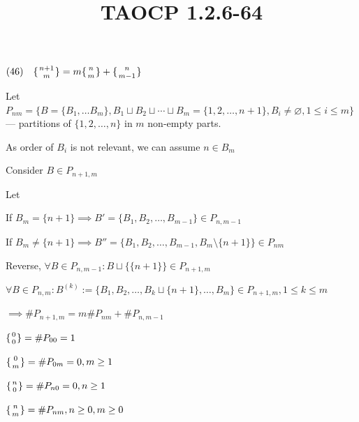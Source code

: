\documentclass{article}
\title{TAOCP 1.2.6\mbox{-}64}
\begin{document}
\maketitle

\( (46)\quad \{{{n+1} \atop m}\} = m\{{{n} \atop m}\} + \{{{n} \atop m - 1}\} \)

Let \( P_{nm} = \{ B = \{ B_{1}, \ldots B_{m} \}, B_{1}\sqcup B_{2}\sqcup \cdots \sqcup B_{m} = \{ 1, 2, \ldots, n + 1 \}, B_{i} \neq \varnothing, 1 \leq i \leq m \} \) --- partitions of \( \{ 1, 2, \ldots, n\} \) in \( m \) non-empty parts.

As order of \( B_{i} \) is not relevant, we can assume \( n \in B_{m} \)

Consider \( B \in P_{n+1,m} \)

Let

If \( B_{m} = \{ n + 1 \} \implies B' = \{ B_{1}, B_{2}, \ldots, B_{m-1} \} \in P_{n,m-1} \)

If \( B_{m} \neq \{ n + 1 \} \implies B'' = \{ B_{1}, B_{2}, \ldots, B_{m-1}, B_{m} \setminus \{ n + 1 \} \} \in P_{nm} \)

Reverse, \( \forall B \in P_{n, m-1}: B \sqcup \{ \{ n + 1 \} \} \in P_{n+1,m} \)

\( \forall B \in P_{n, m}: B^{(k)} := \{ B_{1}, B_{2}, \ldots, B_{k} \sqcup \{ n + 1 \}, \ldots, B_{m} \} \in P_{n+1,m}, 1 \leq k \leq m \)

\( \implies \#P_{n+1,m} = m \#P_{nm} + \#P_{n,m-1} \)

\( \{{0 \atop 0}\} = \#P_{00} = 1 \)

\( \{{0 \atop m}\} = \#P_{0m} = 0, m \geq 1 \)

\( \{{n \atop 0}\} = \#P_{n0} = 0, n \geq 1 \)

\( \{{n \atop m}\} = \#P_{nm}, n \geq 0, m \geq 0 \)
\end{document}
